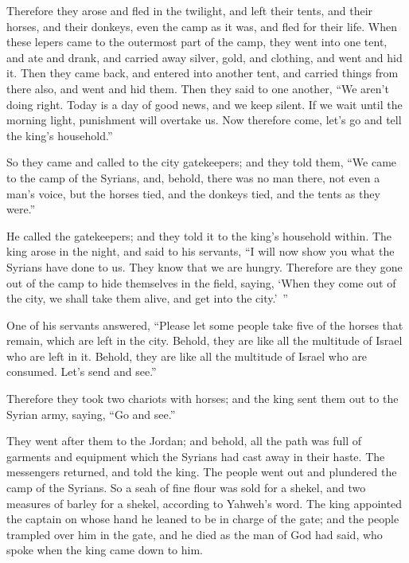 {Therefore they arose and fled in the twilight, and left their tents, and their horses, and their donkeys, even the camp as it was, and fled for their life.
When these lepers came to the outermost part of the camp, they went into one tent, and ate and drank, and carried away silver, gold, and clothing, and went and hid it. Then they came back, and entered into another tent, and carried things from there also, and went and hid them.
Then they said to one another, “We aren’t doing right. Today is a day of good news, and we keep silent. If we wait until the morning light, punishment will overtake us. Now therefore come, let’s go and tell the king’s household.”
\par }{\PP {}So they came and called to the city gatekeepers; and they told them, “We came to the camp of the Syrians, and, behold, there was no man there, not even a man’s voice, but the horses tied, and the donkeys tied, and the tents as they were.”
\par }{\PP {}He called the gatekeepers; and they told it to the king’s household within.
The king arose in the night, and said to his servants, “I will now show you what the Syrians have done to us. They know that we are hungry. Therefore are they gone out of the camp to hide themselves in the field, saying, ‘When they come out of the city, we shall take them alive, and get into the city.’ ”
\par }{\PP {}One of his servants answered, “Please let some people take five of the horses that remain, which are left in the city. Behold, they are like all the multitude of Israel who are left in it. Behold, they are like all the multitude of Israel who are consumed. Let’s send and see.”
\par }{\PP {}Therefore they took two chariots with horses; and the king sent them out to the Syrian army, saying, “Go and see.”
\par }{\PP {}They went after them to the Jordan; and behold, all the path was full of garments and equipment which the Syrians had cast away in their haste. The messengers returned, and told the king.
The people went out and plundered the camp of the Syrians. So a seah of fine flour was sold for a shekel, and two measures of barley for a shekel, according to Yahweh’s word.
The king appointed the captain on whose hand he leaned to be in charge of the gate; and the people trampled over him in the gate, and he died as the man of God had said, who spoke when the king came down to him.
}
